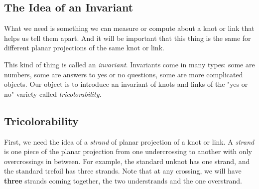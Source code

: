 \documentclass[12pt,letterpaper]{article}
\theoremstyle{definition}
\begin{document}
\subsection*{The Idea of an Invariant}

What we need is something we can measure or compute about a knot or link that helps us tell them apart. And it will be important that this thing is the same for different planar projections of the same knot or link.

This kind of thing is called an \emph{invariant}.
Invariants come in many types: some are numbers, some are answers to yes or no questions, some are more complicated objects. Our object is to introduce an invariant of knots and links of the "yes or no" variety called \emph{tricolorability}.

\subsection*{Tricolorability}

First, we need the idea of a \emph{strand} of planar projection of a knot or link.
A \emph{strand} is one piece of the planar projection from one undercrossing to another with only overcrossings in between.
For example, the standard unknot has one strand, and the standard trefoil has three strands.
Note that at any crossing, we will have \textbf{three} strands coming together, the two understrands and the one overstrand.
\end{document}
